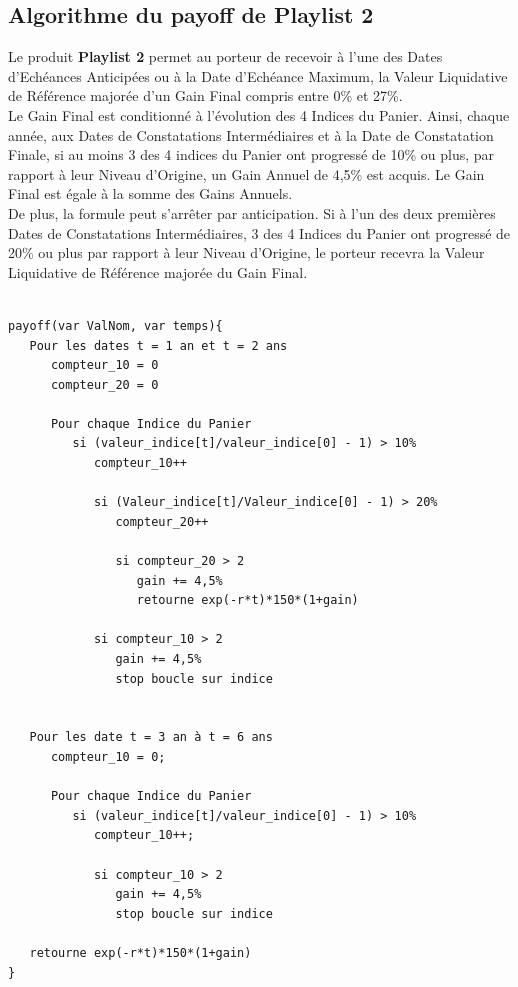 \documentclass[french,12pt,a4paper]{article}
\begin{document}
\subsection{Algorithme du payoff de \textbf{Playlist 2}}
Le produit \textbf{Playlist 2} permet au porteur de recevoir à l'une des Dates d'Echéances Anticipées ou à la Date d'Echéance Maximum, la Valeur Liquidative de Référence majorée d'un Gain Final compris entre 0\% et 27\%.\\
Le Gain Final est conditionné à l'évolution des 4 Indices du Panier. Ainsi, chaque année, aux Dates de Constatations Intermédiaires et à la Date de Constatation Finale, si au moins 3 des 4 indices du Panier ont progressé de 10\% ou plus, par rapport à leur Niveau d'Origine, un Gain Annuel de 4,5\% est acquis. Le Gain Final est égale à la somme des Gains Annuels.\\
De plus, la formule peut s'arrêter par anticipation. Si à l'un des deux premières Dates de Constatations Intermédiaires, 3 des 4 Indices du Panier ont progressé de 20\% ou plus par rapport à leur Niveau d'Origine, le porteur recevra la Valeur Liquidative de Référence majorée du Gain Final.\\

\begin{verbatim}

payoff(var ValNom, var temps){
   Pour les dates t = 1 an et t = 2 ans
      compteur_10 = 0
      compteur_20 = 0
   		
      Pour chaque Indice du Panier
         si (valeur_indice[t]/valeur_indice[0] - 1) > 10%
            compteur_10++
   				
            si (Valeur_indice[t]/Valeur_indice[0] - 1) > 20%
               compteur_20++
   				
               si compteur_20 > 2
                  gain += 4,5%
                  retourne exp(-r*t)*150*(1+gain)
   					
            si compteur_10 > 2
               gain += 4,5%
               stop boucle sur indice
   				
   				
   Pour les date t = 3 an à t = 6 ans
      compteur_10 = 0;
   		
      Pour chaque Indice du Panier
         si (valeur_indice[t]/valeur_indice[0] - 1) > 10%
            compteur_10++;
   				
            si compteur_10 > 2
               gain += 4,5%
               stop boucle sur indice

   retourne exp(-r*t)*150*(1+gain)
}
\end{verbatim}
\end{document}
